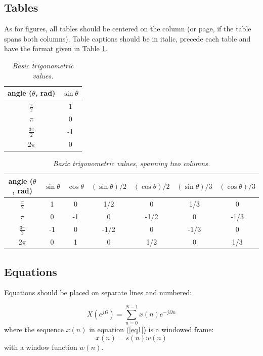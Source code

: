 \documentclass[twoside,a4paper]{article}
\begin{document}
\subsection{Tables}
As for figures, all tables should be centered on the column (or page, if the table spans both columns).
Table captions should be in italic, precede each table and have the format given in Table \ref{tab:example}.

\begin{table}[htdp]
  \caption{{\it Basic trigonometric values.}}
  \begin{center}
    \begin{tabular}{|c|c|}\hline
        angle ($\theta$, rad) & $\sin \theta$ \\\hline
    $\frac{\pi}{2}$ & 1 \\
    $\pi$ & 0 \\
    $\frac{3\pi}{2}$ & -1 \\
    $2\pi$ & 0 \\\hline
    \end{tabular}
  \end{center}
  \label{tab:example}
\end{table}

\begin{table}[htdp]
  \caption{{\it Basic trigonometric values, spanning two columns.}}
  \begin{center}
    \begin{tabular}{|c|c|c|c|c|c|c|}\hline
        angle ($\theta$, rad) & $\sin \theta$ & $\cos \theta $ & $(\sin \theta)/2 $ & $(\cos \theta) /2 $ & $(\sin \theta)/3 $ & $(\cos \theta)/3$    \\\hline
    $\frac{\pi}{2}$ & 1 & 0 & 1/2 & 0 & 1/3 & 0 \\
    $\pi$ & 0 & -1 & 0 & -1/2 & 0 & -1/3\\
    $\frac{3\pi}{2}$ & -1 & 0 & -1/2 & 0 & -1/3 & 0 \\
    $2\pi$ & 0 & 1 & 0 & 1/2 & 0 & 1/3\\\hline
    \end{tabular}
  \end{center}
  \label{tab:example2}
\end{table}

\subsection{Equations}
Equations should be placed on separate lines and numbered:

\begin{equation}
X(e^{j\Omega})=\sum_{n=0}^{N-1}x(n)e^{-j\Omega n}
\label{eq1}
\end{equation}
where the sequence $x(n)$ in equation (\ref{eq1}) is a windowed frame:
\begin{equation}
x(n)=s(n) w(n)
\label{eq2}
\end{equation}
with a window function $w(n)$.
\end{document}
